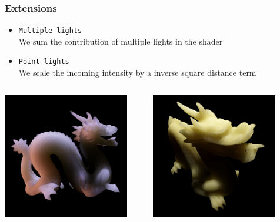 \documentclass{beamer}
\begin{document}
\begin{frame}
    \frametitle{Extensions}
\begin{itemize}
\vspace{0.4cm}
	\item \texttt{Multiple lights} \\ We sum the contribution of multiple lights in the shader
	\item \texttt{Point lights} \\ We scale the incoming intensity by a inverse square distance term	
\end{itemize}
\begin{columns}
    \begin{column}{0.45\textwidth}
      \centering
		\includegraphics[width=0.9\textwidth]{multiple}
				\end{column}
   \begin{column}{0.45\textwidth}
      \centering
		\includegraphics[width=0.9\textwidth]{point}
				\end{column}
​  \end{columns}
\end{frame}
\end{document}
